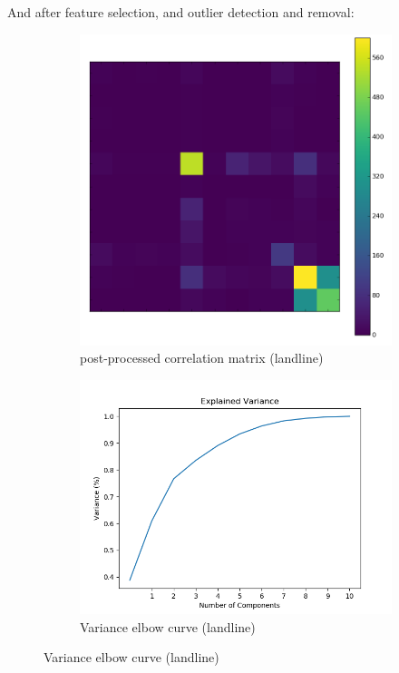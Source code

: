 \documentclass[20pt]{article} %
\begin{document}
\newpage
And after feature selection, and outlier detection and removal:

\begin{figure}[!htbp]
  	\centering
   	\begin{subfigure}[p]{0.4\linewidth}
    	\includegraphics[width=\linewidth]{../figures/redo/landline/ll_covariance.png}
	\caption{post-processed correlation matrix (landline)}
   	\end{subfigure}
   	\begin{subfigure}[p]{0.4\linewidth}
    	\includegraphics[width=\linewidth]{../figures/redo/landline/ll_explained_variance.png}
	\caption{Variance elbow curve (landline)}
   	\end{subfigure}
\end{figure} 
\end{document}
